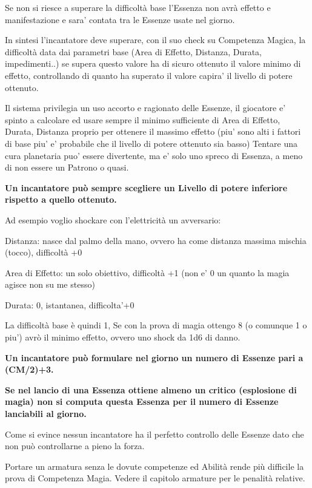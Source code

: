 \documentclass[a4paper,11pt,twoside,openany]{book}
\begin{document}
Se non si riesce a superare la difficoltà base l'Essenza non avrà effetto e manifestazione e sara' contata tra le Essenze usate nel giorno.

In sintesi l'incantatore deve superare, con il suo check su Competenza Magica, la difficoltà data dai parametri base (Area di Effetto, Distanza, Durata, impedimenti..) se supera questo valore ha di sicuro ottenuto il valore minimo di effetto, controllando di quanto ha superato il valore capira' il livello di potere ottenuto.

Il sistema privilegia un uso accorto e ragionato delle Essenze, il giocatore e' spinto a calcolare ed usare sempre il minimo sufficiente di Area di Effetto, Durata, Distanza proprio per ottenere il massimo effetto (piu' sono alti i fattori di base piu' e' probabile che il livello di potere ottenuto sia basso)
Tentare una cura planetaria puo' essere divertente, ma e' solo uno spreco di Essenza, a meno di non essere un Patrono o quasi.

\bigskip

\textbf{Un incantatore può sempre scegliere un Livello di potere inferiore rispetto a quello ottenuto.}

Ad esempio voglio shockare con l'elettricità un avversario:

Distanza: nasce dal palmo della mano, ovvero ha come distanza massima mischia (tocco), difficoltà +0

Area di Effetto: un solo obiettivo, difficoltà +1 (non e' 0 un quanto la magia agisce non su me stesso)

Durata: 0, istantanea, difficolta'+0

La difficoltà base è quindi 1, Se con la prova di magia ottengo 8 (o comunque 1 o piu') avrò il minimo effetto, ovvero uno shock da 1d6 di danno.

\bigskip

\textbf{Un incantatore può formulare nel giorno un numero di Essenze pari a (CM/2)+3.} 

\textbf{Se nel lancio di una Essenza ottiene almeno un critico (esplosione di magia) non si computa questa Essenza per il numero di Essenze lanciabili al giorno.}

Come si evince nessun incantatore ha il perfetto controllo delle Essenze dato che non può controllarne a pieno la forza.

Portare un armatura senza le dovute competenze ed Abilità rende più difficile la prova di Competenza Magia. Vedere il capitolo armature per le penalità relative.
\end{document}

